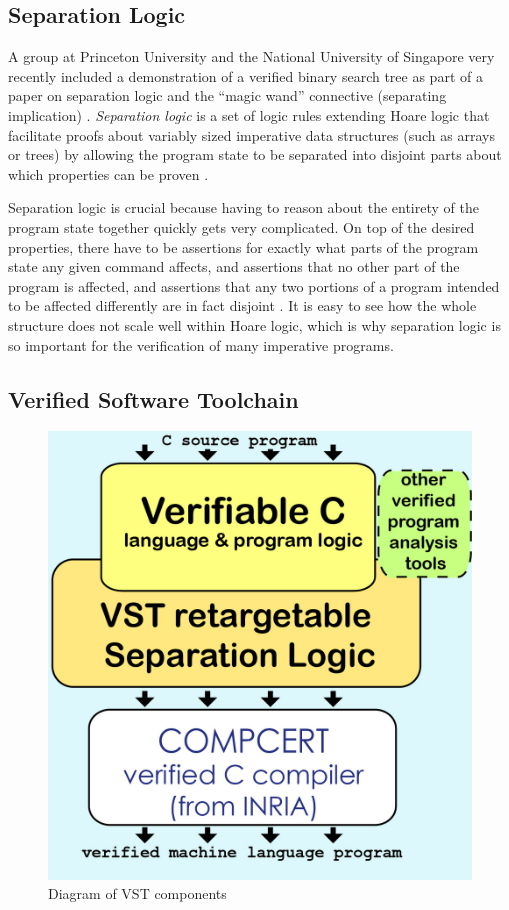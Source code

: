 \documentclass[12pt]{article}
\begin{document}
\subsection{Separation Logic}

A group at Princeton University and the National University of Singapore very recently included a demonstration of a verified binary search tree as part of a paper on separation logic and the “magic wand” connective (separating implication) \cite{cao_wang_hobor_appel_2017}. \textit{Separation logic} is a set of logic rules extending Hoare logic that facilitate proofs about variably sized imperative data structures (such as arrays or trees) by allowing the program state to be separated into disjoint parts about which properties can be proven \cite{1029817}.

Separation logic is crucial because having to reason about the entirety of the program state together quickly gets very complicated. On top of the desired properties, there have to be assertions for exactly what parts of the program state any given command affects, and assertions that no other part of the program is affected, and assertions that any two portions of a program intended to be affected differently are in fact disjoint \cite{1029817}. It is easy to see how the whole structure does not scale well within Hoare logic, which is why separation logic is so important for the verification of many imperative programs.

\subsection{Verified Software Toolchain}

\begin{figure}[ht]
    \begin{center}
		\includegraphics[]{b}
        \caption{Diagram of VST components \protect\cite{vst_2017}}
    \end{center}
\end{figure}
\end{document}
